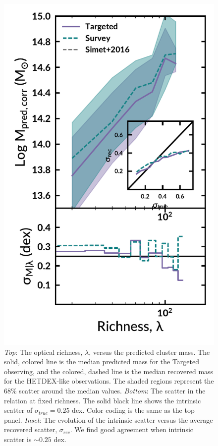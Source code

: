 \documentclass[fleqn,usenatbib]{mnras}
\begin{document}
\begin{figure} 
	\includegraphics[width=\columnwidth]{figures/massRichness.pdf} 
	\caption{\emph{Top}: The optical richness, $\lambda$, versus the predicted cluster mass. The solid, colored line is the median predicted mass for the Targeted observing, and the colored, dashed line is the median recovered mass for the HETDEX-like observations. The shaded regions represent the 68\% scatter around the median values. \emph{Bottom}: The scatter in the relation at fixed richness. The solid black line shows the intrinsic scatter of $\sigma_{true}=0.25$ dex. Color coding is the same as the top panel. \emph{Inset}: The evolution of the intrinsic scatter versus the average recovered scatter, $\sigma_{rec}$. We find good agreement when intrinsic scatter is $\sim0.25$ dex.} \label{fig:mass richness} 
\end{figure}
\end{document}
